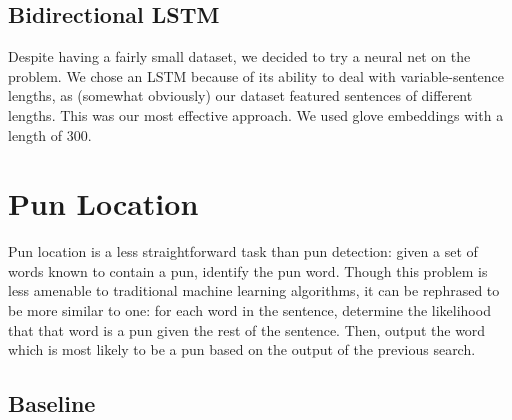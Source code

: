 \documentclass{article}
\begin{document}
\subsection{Bidirectional LSTM}

Despite having a fairly small dataset, we decided to try a neural net on the
problem. We chose an LSTM because of its ability to deal with variable-sentence
lengths, as (somewhat obviously) our dataset featured sentences of different
lengths. This was our most effective approach. We used glove embeddings with a
length of 300.


\section{Pun Location}
\label{pun_location}

Pun location is a less straightforward task than pun detection: given a set of
words known to contain a pun, identify the pun word. Though this problem is less
amenable to traditional machine learning algorithms, it can be rephrased to be
more similar to one: for each word in the sentence, determine the likelihood
that that word is a pun given the rest of the sentence. Then, output the word
which is most likely to be a pun based on the output of the previous search.

\subsection{Baseline}
\end{document}
